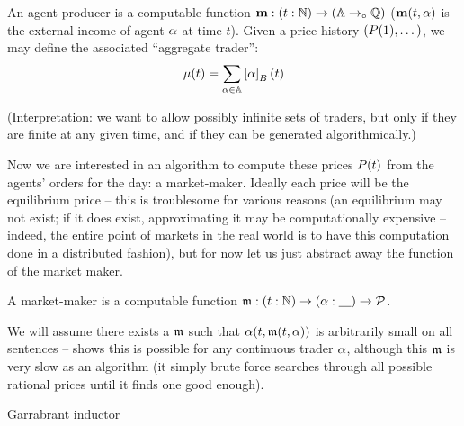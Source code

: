\begin{definition}\label{def:am}
    An agent-producer is a computable function $\mathbf{m} : (t : \mathbb{N}) \to (\mathbb{A} \to_\circ \mathbb{Q})$ ($\mathbf{m}(t,\alpha)$ is the external income of agent $\alpha$ at time $t$). Given a price history $(P(1),\dots)$, we may define the associated ``aggregate trader'':
    \begin{equation*}
        \mgent(t) = \sum_{\agent\in\agents}{\prop[B]{\agent}(t)} \\
    \end{equation*}
\end{definition}

(Interpretation: we want to allow possibly infinite sets of traders, but only if they are finite at any given time, and if they can be generated algorithmically.)

Now we are interested in an algorithm to compute these prices $P(t)$ from the agents' orders for the day: a market-maker. Ideally each price will be the equilibrium price -- this is troublesome for various reasons (an equilibrium may not exist; if it does exist, approximating it may be computationally expensive -- indeed, the entire point of markets in the real world is to have this computation done in a distributed fashion), but for now let us just abstract away the function of the market maker.

\begin{definition}\label{def:mm}
    A market-maker is a computable function $\mathfrak{m} : (t : \mathbb{N}) \to (\alpha :\underline{\quad}) \to \mathcal{P}$.
\end{definition}

We will assume there exists a $\mathfrak{m}$ such that $\alpha(t, \mathfrak{m}(t, \alpha))$ is arbitrarily small on all sentences -- \cite{logical_induction} shows this is possible for any continuous trader $\alpha$, although this $\mathfrak{m}$ is very slow as an algorithm (it simply brute force searches through all possible rational prices until it finds one good enough).

\begin{definition}\label{def:dutch}
    
\end{definition}



\begin{algorithm}\label{alg:li}
    \caption{Garrabrant inductor}
    \begin{algorithmic}[1]
        \Require{}

        
    \end{algorithmic}
\end{algorithm}

